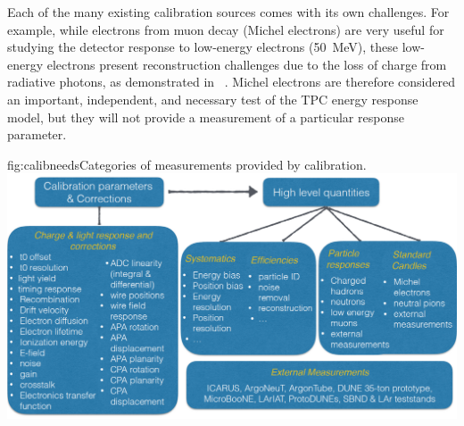 Each of the many existing calibration sources comes with its own challenges. For example, while electrons from muon decay (Michel electrons) are very useful for studying the detector response to low-energy electrons (\SI{50}{\MeV}), these low-energy electrons present reconstruction challenges due to the loss of charge from radiative photons, as demonstrated in ~\cite{Acciarri:2017sjy}.  
Michel electrons are therefore considered an important, independent, and necessary test of the TPC energy response model, but they will not provide a measurement of a particular response parameter.

\begin{dunefigure}{fig:calibneeds}{Categories of measurements provided by calibration.}
\includegraphics[width=.9\textwidth]{graphics/CalibNeedsFig_TDR_cropped.pdf}
\end{dunefigure}

